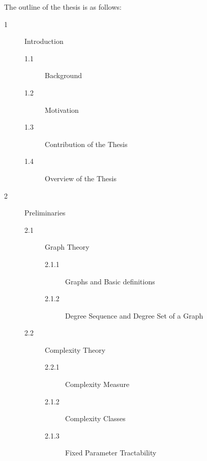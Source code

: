 \singlespacing
The outline of the thesis is as follows:
\begin{description}

  \item[1] Introduction
          \begin{description}
              \item[1.1] Background
              \item[1.2] Motivation
              \item[1.3] Contribution of the Thesis
              \item[1.4] Overview of the Thesis
          \end{description}
                              

  \item[2] Preliminaries
          \begin{description}
             \item[2.1] Graph Theory
                 \begin{description}
                    \item[2.1.1] Graphs and Basic definitions
                    \item[2.1.2] Degree Sequence and Degree Set of a Graph
                 \end{description}
             \item[2.2] Complexity Theory
                 \begin{description}
                    \item[2.2.1] Complexity Measure
                    \item[2.1.2] Complexity Classes
                    \item[2.1.3] Fixed Parameter Tractability
                 \end{description}
          \end{description}



\end{description}
